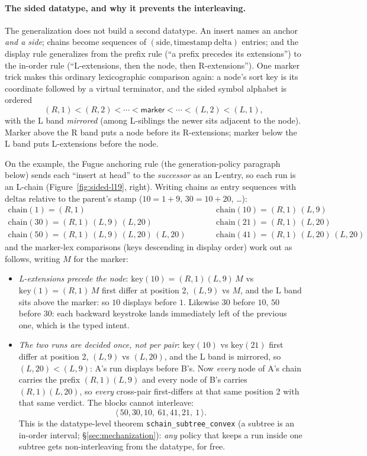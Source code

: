 \documentclass[11pt]{article}
\newcommand{\code}[1]{\texttt{#1}}
\newcommand{\chain}{\mathrm{chain}}
\begin{document}
\paragraph{The sided datatype, and why it prevents the interleaving.}
The generalization does not build a second datatype. An insert names an
anchor \emph{and a side}; chains become sequences of
$(\mathrm{side}, \mathrm{timestamp\ delta})$ entries; and the display
rule generalizes from the prefix rule (``a prefix precedes its
extensions'') to the in-order rule (``L-extensions, then the node, then
R-extensions''). One marker trick makes this ordinary lexicographic
comparison again: a node's sort key is its coordinate followed by a
virtual terminator, and the sided symbol alphabet is ordered
\[
  (R,1) < (R,2) < \cdots < \mathsf{marker} < \cdots < (L,2) < (L,1),
\]
with the L band \emph{mirrored} (among L-siblings the newer sits
adjacent to the node). Marker above the R band puts a node before its
R-extensions; marker below the L band puts L-extensions before the
node.

On the example, the Fugue anchoring rule (the generation-policy
paragraph below) sends each ``insert at head'' to the \emph{successor}
as an L-entry, so each run is an L-chain
(Figure~\ref{fig:sided-l19}, right). Writing chains as
entry sequences with deltas relative to the parent's stamp
($10 = 1 + 9$, $30 = 10 + 20$, \dots):
\[
\begin{array}{lcl}
  \chain(1)  = (R,1) &\qquad&
  \chain(10) = (R,1)\,(L,9) \\
  \chain(30) = (R,1)\,(L,9)\,(L,20) &&
  \chain(21) = (R,1)\,(L,20) \\
  \chain(50) = (R,1)\,(L,9)\,(L,20)\,(L,20) &&
  \chain(41) = (R,1)\,(L,20)\,(L,20)
\end{array}
\]
and the marker-lex comparisons (keys descending in display order) work
out as follows, writing $M$ for the marker:
\begin{itemize}
\item \emph{L-extensions precede the node}: $\mathrm{key}(10) =
  (R,1)(L,9)\,M$ vs $\mathrm{key}(1) = (R,1)\,M$ first differ at
  position 2, $(L,9)$ vs $M$, and the L band sits above the marker: so
  $10$ displays before $1$. Likewise $30$ before $10$, $50$ before
  $30$: each backward keystroke lands immediately left of the previous
  one, which is the typed intent.
\item \emph{The two runs are decided once, not per pair}:
  $\mathrm{key}(10)$ vs $\mathrm{key}(21)$ first differ at position 2,
  $(L,9)$ vs $(L,20)$, and the L band is mirrored, so $(L,20) <
  (L,9)$: A's run displays before B's. Now \emph{every} node of A's
  chain carries the prefix $(R,1)(L,9)$ and every node of B's carries
  $(R,1)(L,20)$, so \emph{every} cross-pair first-differs at that same
  position 2 with that same verdict. The blocks cannot interleave:
  \[
    \langle\, 50, 30, 10,\ 61, 41, 21,\ 1 \,\rangle .
  \]
  This is the datatype-level theorem \code{schain\_subtree\_convex}
  (a subtree is an in-order interval; \S\ref{sec:mechanization}):
  \emph{any} policy that keeps a run inside one subtree gets
  non-interleaving from the datatype, for free.
\end{itemize}
\end{document}
